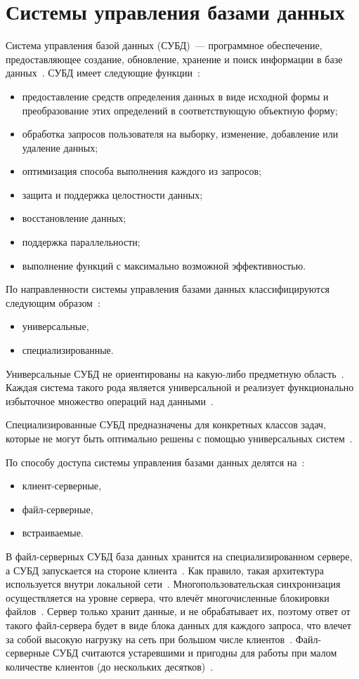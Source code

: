 \section{Системы управления базами данных}

Система управления базой данных (СУБД)~--- программное обеспечение, предоставляющее создание, обновление, хранение и поиск информации в базе данных~\cite{db}.
СУБД имеет следующие функции~\cite{db}:
\begin{itemize}
	\item предоставление средств определения данных в виде исходной формы и преобразование этих определений в соответствующую объектную форму;
	\item обработка запросов пользователя на выборку, изменение, добавление или удаление данных;
	\item оптимизация способа выполнения каждого из запросов;
	\item защита и поддержка целостности данных;
	\item восстановление данных;
	\item поддержка параллельности;
	\item выполнение функций с максимально возможной эффективностью.
\end{itemize}

По направленности системы управления базами данных классифицируются следующим образом~\cite{dbmsu}:
\begin{itemize}
	\item универсальные,
	\item специализированные.
\end{itemize}

Универсальные СУБД не ориентированы на какую-либо предметную область~\cite{dbmsu}.
Каждая система такого рода является универсальной и реализует функционально избыточное множество операций над данными~\cite{dbmsu}.

Специализированные СУБД предназначены для конкретных классов задач, которые не могут быть оптимально решены с помощью универсальных систем~\cite{dbmsu}.

По способу доступа системы управления базами данных делятся на~\cite{dbmsu}:
\begin{itemize}
	\item клиент-серверные,
	\item файл-серверные,
	\item встраиваемые.
\end{itemize}

В файл-серверных СУБД база данных хранится на специализированном сервере, а СУБД запускается на стороне клиента~\cite{dbmsu}.
Как правило, такая архитектура используется внутри локальной сети~\cite{dbmsu}.
Многопользовательская синхронизация осуществляется на уровне сервера, что влечёт многочисленные блокировки файлов~\cite{dbmsu}.
Сервер только хранит данные, и не обрабатывает их, поэтому ответ от такого файл-сервера будет в виде блока данных для каждого запроса, что влечет за собой высокую нагрузку на сеть при большом числе клиентов~\cite{dbmsu}.
Файл-серверные СУБД считаются устаревшими и пригодны для работы при малом количестве клиентов (до нескольких десятков)~\cite{dbmsu}.

